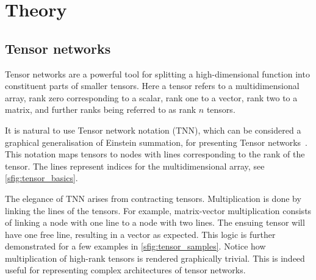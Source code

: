 



\section{Theory}

\subsection{Tensor networks}

Tensor networks are a powerful tool for splitting a high-dimensional function into constituent parts of smaller tensors. 
Here a tensor refers to a multidimensional array, rank zero corresponding to a scalar, rank one to a vector, rank two to a matrix, and further ranks being referred to as rank $n$ tensors.

It is natural to use Tensor network notation (TNN), which can be considered a graphical generalisation of Einstein summation, for presenting Tensor networks~\cite{Bridgeman_2017}. This notation maps tensors to  nodes with lines corresponding to the rank of the tensor. The lines represent indices for the multidimensional array, see \cref{sfig:tensor_basics}.

The elegance of TNN arises from contracting tensors. Multiplication is done by linking the lines of the tensors. For example, matrix-vector multiplication consists of linking a node with one line to a node with two lines. The ensuing tensor will have one free line, resulting in a vector as expected.
This logic is further demonstrated for a few examples in \cref{sfig:tensor_samples}.
Notice how multiplication of high-rank tensors is rendered graphically trivial. This is indeed useful for representing complex architectures of tensor networks.



